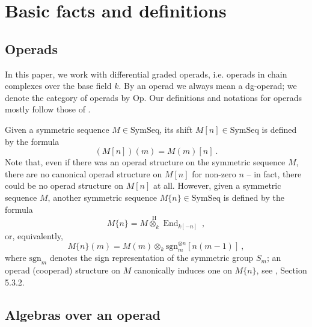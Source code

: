 \documentclass[10pt, oneside]{amsart}
\theoremstyle{plain}
\DeclareMathOperator{\en}{End}
\newcommand{\op}{\mathrm{Op}}
\newcommand{\sgn}{\mathrm{sgn}}
\begin{document}


\section{Basic facts and definitions}\label{sec2}

\subsection{Operads}

In this paper, we work with differential graded operads, i.e. operads in chain complexes over the base field $k$.
By an operad we always mean a dg-operad; we denote the category of operads by $\op$. Our definitions and notations for operads
mostly follow those of \cite{LV}.

Given a symmetric sequence $M \in \text{SymSeq}$, its shift $M[n] \in \text{SymSeq}$ is defined by the formula
\begin{equation*}
(M[n])(m) = M(m)[n] \:.
\end{equation*}
Note that, even if there was an operad structure on the symmetric sequence $M$, there are no canonical operad structure on $M[n]$ for
non-zero $n$ -- in fact, there could be no operad structure on $M[n]$ at all. However, given a symmetric sequence $M$, another symmetric
sequence $M\{n\} \in \text{SymSeq}$ is defined by the formula
\begin{equation*}
M\{n\} = M \stackrel{\text{H}}{\otimes_k} \en_{k[-n]} \:,
\end{equation*}
or, equivalently,
\begin{equation*}
M\{n\}(m) = M(m) \otimes_k \sgn_m^{\otimes n} [n(m-1)] \:,
\end{equation*}
where $\sgn_m$ denotes the sign representation of the symmetric group $S_m$; an operad (cooperad) structure on $M$ canonically induces
one on $M\{n\}$, see \cite{LV}, Section 5.3.2.

\subsection{Algebras over an operad}
\end{document}

